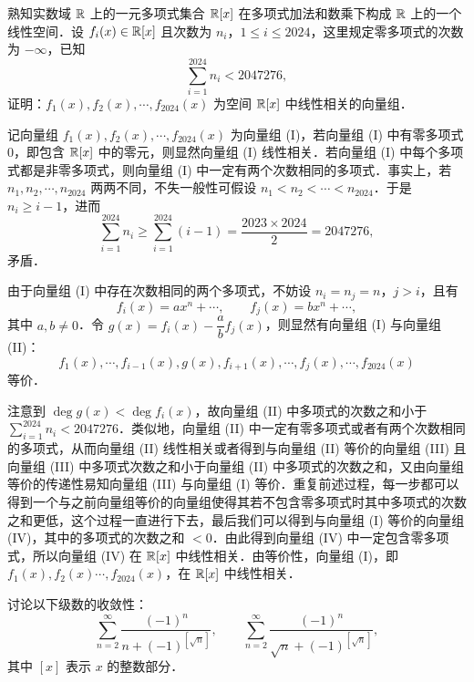 熟知实数域 $\mathbb{R}$ 上的一元多项式集合 $\mathbb{R}[x]$ 在多项式加法和数乘下构成 $\mathbb{R}$ 上的一个线性空间．设 $f_i(x)\in\mathbb{R}[x]$ 且次数为 $n_i$，$1\le i\le 2024$，这里规定零多项式的次数为 $-\infty$，已知
\[
  \sum_{i=1}^{2024} n_i<2047276,
\]
证明：$f_1(x),f_2(x),\cdots,f_{2024}(x)$ 为空间 $\mathbb{R}[x]$ 中线性相关的向量组．

\begin{solution}
记向量组 $f_1(x),f_2(x),\cdots,f_{2024}(x)$ 为向量组 (I)，若向量组 (I) 中有零多项式 $0$，即包含 $\mathbb{R}[x]$ 中的零元，则显然向量组 (I) 线性相关．若向量组 (I) 中每个多项式都是非零多项式，则向量组 (I) 中一定有两个次数相同的多项式．事实上，若 $n_1,n_2,\cdots,n_{2024}$ 两两不同，不失一般性可假设 $n_1<n_2<\cdots<n_{2024}$．于是 $n_i\ge i-1$，进而
\[
  \sum_{i=1}^{2024} n_i\ge \sum_{i=1}^{2024}(i-1)=\frac{2023\times 2024}{2}=2047276,
\]
矛盾．

由于向量组 (I) 中存在次数相同的两个多项式，不妨设 $n_i=n_j=n$，$j>i$，且有
\[
  f_i(x)=ax^n+\cdots,\qquad f_j(x)=bx^n+\cdots,
\]
其中 $a,b\ne 0$．令 $g(x)=f_i(x)-\dfrac{a}{b}f_j(x)$，则显然有向量组 (I) 与向量组 (II)：
\[
  f_1(x),\cdots,f_{i-1}(x),g(x),f_{i+1}(x),\cdots,f_j(x),\cdots,f_{2024}(x)
\]
等价．

注意到 $\deg g(x)<\deg f_i(x)$，故向量组 (II) 中多项式的次数之和小于 $\displaystyle\sum_{i=1}^{2024}n_i<2047276$．类似地，向量组 (II) 中一定有零多项式或者有两个次数相同的多项式，从而向量组 (II) 线性相关或者得到与向量组 (II) 等价的向量组 (III) 且向量组 (III) 中多项式次数之和小于向量组 (II) 中多项式的次数之和，又由向量组等价的传递性易知向量组 (III) 与向量组 (I) 等价．重复前述过程，每一步都可以得到一个与之前向量组等价的向量组使得其若不包含零多项式时其中多项式的次数之和更低，这个过程一直进行下去，最后我们可以得到与向量组 (I) 等价的向量组 (IV)，其中的多项式的次数之和 $<0$．由此得到向量组 (IV) 中一定包含零多项式，所以向量组 (IV) 在 $\mathbb{R}[x]$ 中线性相关．由等价性，向量组 (I)，即 $f_1(x),f_2(x)\cdots,f_{2024}(x)$，在 $\mathbb{R}[x]$ 中线性相关．
\end{solution}

讨论以下级数的收敛性：
\[
  \sum_{n=2}^{\infty}\frac{(-1)^n}{n+(-1)^{[\sqrt{n}]}},
  \qquad
  \sum_{n=2}^{\infty}\frac{(-1)^n}{\sqrt{n}+(-1)^{[\sqrt{n}]}},
\]
其中 $[x]$ 表示 $x$ 的整数部分．

